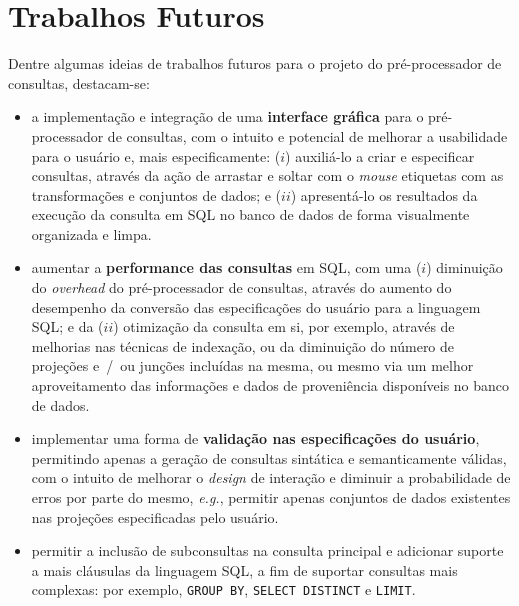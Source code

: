 \section{Trabalhos Futuros}

Dentre algumas ideias de trabalhos futuros para o projeto do pré-processador de consultas, destacam-se:

\begin{itemize}
    \item a implementação e integração de uma \textbf{interface gráfica} para o pré-processador de consultas, com o intuito e potencial de melhorar a usabilidade para o usuário e, mais especificamente: (\(i\)) auxiliá-lo a criar e especificar consultas, através da ação de arrastar e soltar com o \textit{mouse} etiquetas com as transformações e conjuntos de dados; e (\(ii\)) apresentá-lo os resultados da execução da consulta em SQL no banco de dados de forma visualmente organizada e limpa.
    \item aumentar a \textbf{performance das consultas} em SQL, com uma (\(i\)) diminuição do \textit{overhead} do pré-processador de consultas, através do aumento do desempenho da conversão das especificações do usuário para a linguagem SQL; e da (\(ii\)) otimização da consulta em si, por exemplo, através de melhorias nas técnicas de indexação, ou da diminuição do número de projeções e~/~ou junções incluídas na mesma, ou mesmo via um melhor aproveitamento das informações e dados de proveniência disponíveis no banco de dados.
    \item implementar uma forma de \textbf{validação nas especificações do usuário}, permitindo apenas a geração de consultas sintática e semanticamente válidas, com o intuito de melhorar o \textit{design} de interação e diminuir a probabilidade de erros por parte do mesmo, \textit{e.g.}, permitir apenas conjuntos de dados existentes nas projeções especificadas pelo usuário.
    \item permitir a inclusão de subconsultas na consulta principal e adicionar suporte a mais cláusulas da linguagem SQL, a fim de suportar consultas mais complexas: por exemplo, \texttt{GROUP BY}, \texttt{SELECT DISTINCT} e \texttt{LIMIT}.
\end{itemize}
